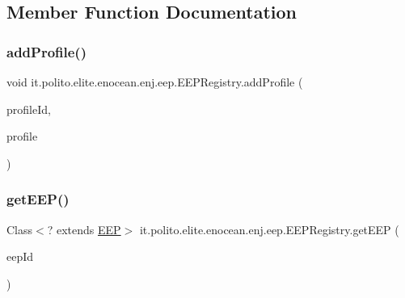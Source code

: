 \subsection{Member Function Documentation}
\hypertarget{classit_1_1polito_1_1elite_1_1enocean_1_1enj_1_1eep_1_1_e_e_p_registry_ab1e30930a41ca7f9232ecbaca8ddd3d7}{}\label{classit_1_1polito_1_1elite_1_1enocean_1_1enj_1_1eep_1_1_e_e_p_registry_ab1e30930a41ca7f9232ecbaca8ddd3d7} 
\subsubsection{\texorpdfstring{add\+Profile()}{addProfile()}}
{\footnotesize\ttfamily void it.\+polito.\+elite.\+enocean.\+enj.\+eep.\+E\+E\+P\+Registry.\+add\+Profile (\begin{DoxyParamCaption}\item[{\hyperlink{classit_1_1polito_1_1elite_1_1enocean_1_1enj_1_1eep_1_1_e_e_p_identifier}{E\+E\+P\+Identifier}}]{profile\+Id,  }\item[{Class$<$? extends \hyperlink{classit_1_1polito_1_1elite_1_1enocean_1_1enj_1_1eep_1_1_e_e_p}{E\+EP} $>$}]{profile }\end{DoxyParamCaption})}

\hypertarget{classit_1_1polito_1_1elite_1_1enocean_1_1enj_1_1eep_1_1_e_e_p_registry_a7c05134fa6795e1b8e21eb3719e78ddc}{}\label{classit_1_1polito_1_1elite_1_1enocean_1_1enj_1_1eep_1_1_e_e_p_registry_a7c05134fa6795e1b8e21eb3719e78ddc} 
\subsubsection{\texorpdfstring{get\+E\+E\+P()}{getEEP()}}
{\footnotesize\ttfamily Class$<$? extends \hyperlink{classit_1_1polito_1_1elite_1_1enocean_1_1enj_1_1eep_1_1_e_e_p}{E\+EP}$>$ it.\+polito.\+elite.\+enocean.\+enj.\+eep.\+E\+E\+P\+Registry.\+get\+E\+EP (\begin{DoxyParamCaption}\item[{\hyperlink{classit_1_1polito_1_1elite_1_1enocean_1_1enj_1_1eep_1_1_e_e_p_identifier}{E\+E\+P\+Identifier}}]{eep\+Id }\end{DoxyParamCaption})}

